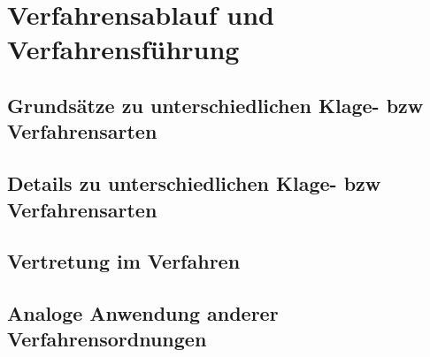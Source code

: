 
\chapter{Verfahrensablauf und Verfahrensführung}
\blindtext[1]
\section{Grundsätze zu unterschiedlichen Klage- bzw Verfahrensarten}
\blindtext[5]
\section{Details zu unterschiedlichen Klage- bzw Verfahrensarten}
\blindtext[5]
\section{Vertretung im Verfahren}
\blindtext[5]
\section{Analoge Anwendung anderer Verfahrensordnungen}
\blindtext[5]

\chapterbib
